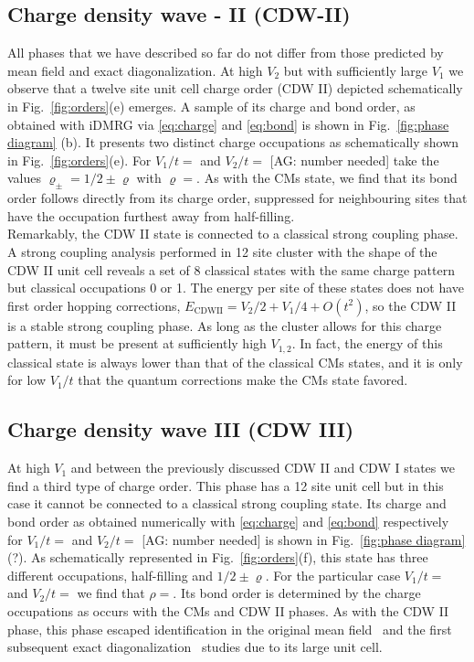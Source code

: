 \documentclass[aps,prx,10pt,twocolumn,floatfix,superscriptaddress,showpacs,numerical,footinbib]{revtex4-1}
\newcommand{\noteAG}[1]{{\color{blue} [AG: #1]}}
\begin{document}
\subsection{Charge density wave - II (CDW-II)}
%
All phases that we have described so far do not differ
from those predicted by mean field and exact diagonalization.
%
At high $V_{2}$ but with sufficiently large $V_{1}$ we observe that
a twelve site unit cell charge order (CDW II) depicted schematically in 
Fig.~\ref{fig:orders}(e) emerges.
%
A sample of its charge and bond order, as obtained with iDMRG via \eqref{eq:charge} and \eqref{eq:bond} is
shown in Fig.~\ref{fig:phase diagram} (b).
%
It presents two distinct charge occupations as schematically shown in Fig.~\ref{fig:orders}(e).
%
For $V_{1}/t=$ and $V_{2}/t=$\noteAG{number needed} 
take the values $\varrho_{\pm}=1/2\pm\varrho$ with $\varrho=$.
%
As with the CMs state, we find that its bond order follows directly from its charge order, suppressed for neighbouring sites that have
the occupation furthest away from half-filling.\\
%

%
Remarkably, the CDW II state is connected to a classical strong coupling phase.
%
A strong coupling analysis performed in 12 site cluster with the shape of the CDW II 
unit cell reveals a set of 8 classical states with the same charge pattern but classical occupations 0 or 1. 
%
The energy per site of these states does not have first order hopping corrections,
$E_{\mathrm{CDW II}} = V_2/2+V_1/4 + O(t^2)$, so the CDW II is a stable strong coupling phase. 
%
As long as the cluster allows for this charge pattern, it must be present at sufficiently high $V_{1,2}$.
%
In fact, the energy of this classical state is always lower than that of the classical CMs states, 
and it is only for low $V_1/t$ that the quantum corrections make the CMs state favored. 
%

\subsection{Charge density wave III (CDW III)}
%
At high $V_{1}$ and between the previously discussed CDW II and CDW I states
we find a third type of charge order.
%
This phase has a 12 site unit cell but in this case it cannot be connected to a classical strong coupling state.
%
Its charge and bond order as obtained numerically with \eqref{eq:charge} and \eqref{eq:bond} respectively
for $V_{1}/t=$ and $V_{2}/t=$\noteAG{number needed} is shown in Fig.~\ref{fig:phase diagram}(?).
%
As schematically represented in Fig.~\ref{fig:orders}(f), this state has three 
different occupations, half-filling and $1/2\pm\varrho$.
%
For the particular case $V_{1}/t=$ and $V_{2}/t=$ we find that $\rho=$.
%
Its bond order is determined by the charge occupations 
as occurs with the CMs and CDW II phases.
%
As with the CDW II phase, this phase escaped
identification in the original mean field~\cite{RQHZ08,WF10,GCC13} 
and the first subsequent exact diagonalization~\cite{GGNVC13,DH14,DCH14} studies 
due to its large unit cell.
%
 
\end{document}
